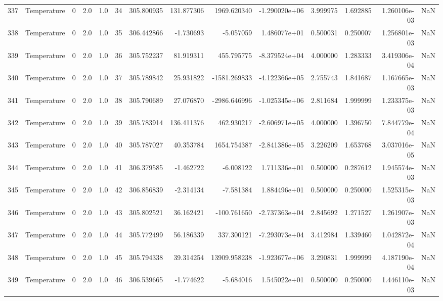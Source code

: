 \begin{tabular}{llrrrrrrrrrrrr}
337 &  Temperature &       0 &  2.0 &  1.0 &   34 &  305.800935 &   131.877306 &    1969.620340 & -1.290020e+06 &  3.999975 &  1.692885 &  1.260106e-03 &      NaN \\
338 &  Temperature &       0 &  2.0 &  1.0 &   35 &  306.442866 &    -1.730693 &      -5.057059 &  1.486077e+01 &  0.500031 &  0.250007 &  1.256801e-03 &      NaN \\
339 &  Temperature &       0 &  2.0 &  1.0 &   36 &  305.752237 &    81.919311 &     455.795775 & -8.379524e+04 &  4.000000 &  1.283333 &  3.419306e-04 &      NaN \\
340 &  Temperature &       0 &  2.0 &  1.0 &   37 &  305.789842 &    25.931822 &   -1581.269833 & -4.122366e+05 &  2.755743 &  1.841687 &  1.167665e-03 &      NaN \\
341 &  Temperature &       0 &  2.0 &  1.0 &   38 &  305.790689 &    27.076870 &   -2986.646996 & -1.025345e+06 &  2.811684 &  1.999999 &  1.233375e-03 &      NaN \\
342 &  Temperature &       0 &  2.0 &  1.0 &   39 &  305.783914 &   136.411376 &     462.930217 & -2.606971e+05 &  4.000000 &  1.396750 &  7.844779e-04 &      NaN \\
343 &  Temperature &       0 &  2.0 &  1.0 &   40 &  305.787027 &    40.353784 &    1654.754387 & -2.841386e+05 &  3.226209 &  1.653768 &  3.037016e-05 &      NaN \\
344 &  Temperature &       0 &  2.0 &  1.0 &   41 &  306.379585 &    -1.462722 &      -6.008122 &  1.711336e+01 &  0.500000 &  0.287612 &  1.945574e-03 &      NaN \\
345 &  Temperature &       0 &  2.0 &  1.0 &   42 &  306.856839 &    -2.314134 &      -7.581384 &  1.884496e+01 &  0.500000 &  0.250000 &  1.525315e-03 &      NaN \\
346 &  Temperature &       0 &  2.0 &  1.0 &   43 &  305.802521 &    36.162421 &    -100.761650 & -2.737363e+04 &  2.845692 &  1.271527 &  1.261907e-03 &      NaN \\
347 &  Temperature &       0 &  2.0 &  1.0 &   44 &  305.772499 &    56.186339 &     337.300121 & -7.293073e+04 &  3.412984 &  1.339460 &  1.042872e-04 &      NaN \\
348 &  Temperature &       0 &  2.0 &  1.0 &   45 &  305.794338 &    39.314254 &   13909.958238 & -1.923677e+06 &  3.290831 &  1.999999 &  4.187190e-04 &      NaN \\
349 &  Temperature &       0 &  2.0 &  1.0 &   46 &  306.539665 &    -1.774622 &      -5.684016 &  1.545022e+01 &  0.500000 &  0.250000 &  1.446110e-03 &      NaN \\

\end{tabular}
